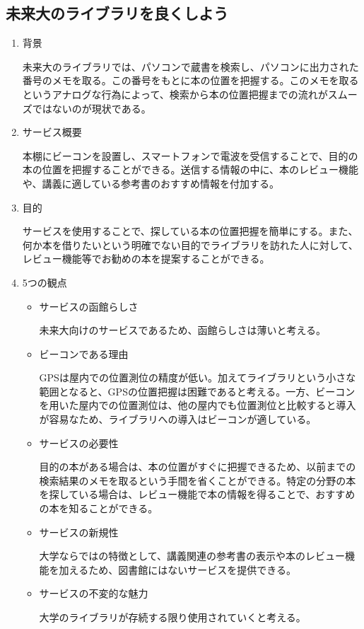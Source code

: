 \subsection{未来大のライブラリを良くしよう}
\begin{enumerate}
    \item 背景
    \par 未来大のライブラリでは、パソコンで蔵書を検索し、パソコンに出力された番号のメモを取る。この番号をもとに本の位置を把握する。このメモを取るというアナログな行為によって、検索から本の位置把握までの流れがスムーズではないのが現状である。
    \item サービス概要
    \par 本棚にビーコンを設置し、スマートフォンで電波を受信することで、目的の本の位置を把握することができる。送信する情報の中に、本のレビュー機能や、講義に適している参考書のおすすめ情報を付加する。
    \item 目的
    \par サービスを使用することで、探している本の位置把握を簡単にする。また、何か本を借りたいという明確でない目的でライブラリを訪れた人に対して、レビュー機能等でお勧めの本を提案することができる。
    \item 5つの観点
    \begin{itemize}
        \item サービスの函館らしさ
        \par 未来大向けのサービスであるため、函館らしさは薄いと考える。
        \item ビーコンである理由
        \par GPSは屋内での位置測位の精度が低い。加えてライブラリという小さな範囲となると、GPSの位置把握は困難であると考える。一方、ビーコンを用いた屋内での位置測位は、他の屋内でも位置測位と比較すると導入が容易なため、ライブラリへの導入はビーコンが適している。
        \item サービスの必要性
        \par 目的の本がある場合は、本の位置がすぐに把握できるため、以前までの検索結果のメモを取るという手間を省くことができる。特定の分野の本を探している場合は、レビュー機能で本の情報を得ることで、おすすめの本を知ることができる。
        \item サービスの新規性
        \par 大学ならではの特徴として、講義関連の参考書の表示や本のレビュー機能を加えるため、図書館にはないサービスを提供できる。
        \item サービスの不変的な魅力
        \par 大学のライブラリが存続する限り使用されていくと考える。
    \end{itemize}
\end{enumerate}

